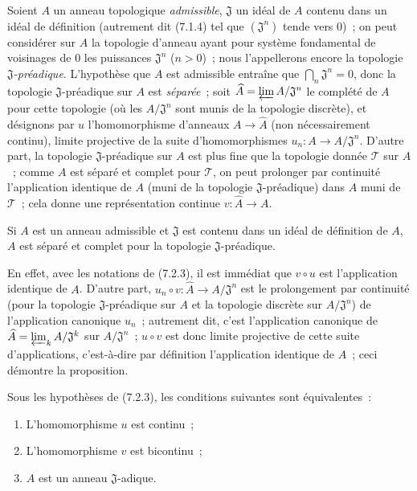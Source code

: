 \begin{env}[7.2.3]
\label{0.7.2.3-fr}
Soient $A$ un anneau topologique \emph{admissible}, $\mathfrak J$ un idéal de $A$
contenu dans un idéal de définition (autrement dit (7.1.4) tel que
$(\mathfrak J^n)$ tende vers $0$)~; on peut considérer sur $A$ la topologie
d'anneau ayant pour système fondamental de voisinages de $0$ les puissances
$\mathfrak J^n$ ($n>0$)~; nous l'appellerons encore la topologie
\emph{$\mathfrak J$-préadique}. L'hypothèse que $A$ est admissible entraîne que
$\bigcap_n\mathfrak J^n=0$, donc la topologie $\mathfrak J$-préadique sur $A$
est \emph{séparée}~; soit
$\widehat A=\varprojlim A/\mathfrak J^n$ le complété de $A$ pour cette topologie
(où les $A/\mathfrak J^n$ sont munis de la topologie discrète), et désignons
par $u$ l'homomorphisme d'anneaux $A\to\widehat A$ (non nécessairement
continu), limite projective de la suite d'homomorphismes
$u_n:A\to A/\mathfrak J^n$. D'autre part, la topologie $\mathfrak J$-préadique
sur $A$ est plus fine que la topologie donnée $\mathcal T$ sur $A$~; comme $A$
est séparé et complet pour $\mathcal T$, on peut prolonger par continuité
l'application identique de $A$ (muni de la topologie $\mathfrak J$-préadique)
dans $A$ muni de $\mathcal T$~; cela donne une représentation continue
$v:\widehat A\to A$.
\end{env}

\begin{proposition}[7.2.4]
\label{0.7.2.4-fr}
Si $A$ est un anneau admissible et $\mathfrak J$ est contenu dans un idéal de
définition de $A$, $A$ est séparé et complet pour la topologie
$\mathfrak J$-préadique.
\end{proposition}

En effet, avec les notations de (7.2.3), il est immédiat que $v\circ u$ est
l'application identique de $A$. D'autre part,
$u_n\circ v:\widehat A\to A/\mathfrak J^n$ est le prolongement par continuité
(pour la topologie $\mathfrak J$-préadique sur $A$ et la topologie discrète sur
$A/\mathfrak J^n$) de l'application canonique $u_n$~; autrement dit, c'est
l'application canonique de
$\widehat A=\varprojlim_k A/\mathfrak J^k$ sur $A/\mathfrak J^n$~;
$u\circ v$ est donc limite projective de cette suite d'applications,
c'est-à-dire par définition l'application identique de $\widehat A$~; ceci
démontre la proposition.

\begin{corollary}[7.2.5]
\label{0.7.2.5-fr}
Sous les hypothèses de \textup{(7.2.3)}, les conditions suivantes sont équivalentes~:
\begin{enumerate}
  \item[{\upshape a)}] L'homomorphisme $u$ est continu~;


  \item[{\upshape b)}] L'homomorphisme $v$ est bicontinu~;
  \item[{\upshape c)}] $A$ est un anneau $\mathfrak J$-adique.
\end{enumerate}
\end{corollary}


